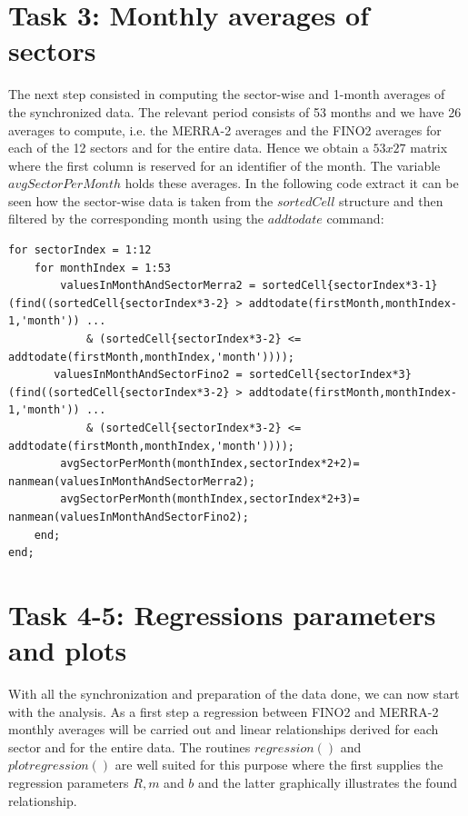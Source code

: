 \documentclass[10pt]{article}
\begin{document}
\section{Task 3: Monthly averages of sectors}
The next step consisted in computing the sector-wise and 1-month averages of the synchronized data. The relevant period consists of 53 months and we have 26 averages to compute, i.e. the MERRA-2 averages and the FINO2 averages for each of the 12 sectors and for the entire data. Hence we obtain a $53 x 27$ matrix where the first column is reserved for an identifier of the month. The variable $avgSectorPerMonth$ holds these averages. In the following code extract it can be seen how the sector-wise data is taken from the $sortedCell$ structure and then filtered by the corresponding month using the $addtodate$ command:
\begin{lstlisting}
for sectorIndex = 1:12
    for monthIndex = 1:53
        valuesInMonthAndSectorMerra2 = sortedCell{sectorIndex*3-1}(find((sortedCell{sectorIndex*3-2} > addtodate(firstMonth,monthIndex-1,'month')) ...
            & (sortedCell{sectorIndex*3-2} <= addtodate(firstMonth,monthIndex,'month'))));
       valuesInMonthAndSectorFino2 = sortedCell{sectorIndex*3}(find((sortedCell{sectorIndex*3-2} > addtodate(firstMonth,monthIndex-1,'month')) ...
            & (sortedCell{sectorIndex*3-2} <= addtodate(firstMonth,monthIndex,'month'))));
        avgSectorPerMonth(monthIndex,sectorIndex*2+2)= nanmean(valuesInMonthAndSectorMerra2);
        avgSectorPerMonth(monthIndex,sectorIndex*2+3)= nanmean(valuesInMonthAndSectorFino2);
    end;
end;
\end{lstlisting} 

\section{Task 4-5: Regressions parameters and plots} 
With all the synchronization and preparation of the data done, we can now start with the analysis. As a first step a regression between FINO2 and MERRA-2 monthly averages will be carried out and linear relationships derived for each sector and for the entire data. The routines $regression()$ and $plotregression()$ are well suited for this purpose where the first supplies the regression parameters $R, m$ and $b$ and the latter graphically illustrates the found relationship. 
\end{document}
